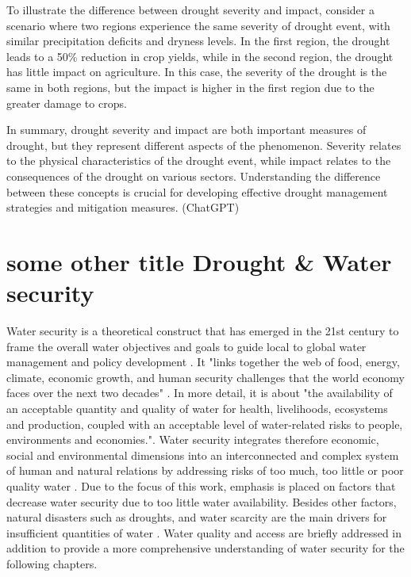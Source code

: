 {To illustrate the difference between drought severity and impact, consider a scenario where two regions experience the same severity of drought event, with similar precipitation deficits and dryness levels. In the first region, the drought leads to a 50\% reduction in crop yields, while in the second region, the drought has little impact on agriculture. In this case, the severity of the drought is the same in both regions, but the impact is higher in the first region due to the greater damage to crops.

In summary, drought severity and impact are both important measures of drought, but they represent different aspects of the phenomenon. Severity relates to the physical characteristics of the drought event, while impact relates to the consequences of the drought on various sectors. Understanding the difference between these concepts is crucial for developing effective drought management strategies and mitigation measures. (ChatGPT)




\section{some other title Drought \& Water security} %

Water security is a theoretical construct that has emerged in the 21st century to frame the overall water objectives and goals to guide local to global water management and policy development \autocite{sadoffWaterSecurity2020a}. It "links together the web of food, energy, climate, economic growth, and human security challenges that the world economy faces over the next two decades" \autocite[5]{wefBubbleCloseBursting2009}. In more detail, it is about "the availability of an acceptable quantity and quality of water for health, livelihoods, ecosystems and production, coupled with an acceptable level of water-related risks to people, environments and economies."\autocite{greySinkSwimWater2007}.
Water security integrates therefore economic, social and environmental dimensions into an interconnected and complex system of human and natural relations by addressing risks of too much, too little or poor quality water \autocite{vanbeekWaterSecurityPutting2014, mishraWaterSecurityChanging2021}. Due to the focus of this work, emphasis is placed on factors that decrease water security due to too little water availability. Besides other factors, natural disasters such as droughts, and water scarcity are the main drivers for insufficient quantities of water \autocite{caretta2022water}. Water quality and access are briefly addressed in addition to provide a more comprehensive  understanding of water security for the following chapters.


}
